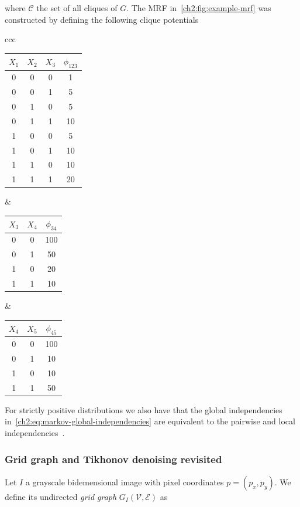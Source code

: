where $\mathcal{C}$ the set of all cliques of $G$. The MRF in~\cref{ch2:fig:example-mrf} was constructed by defining the following clique potentials

\begin{center}
\begin{tabular}{ccc}
\begin{tabular}{|c|c|c|c|}
\hline
$X_1$ & $X_2$ & $X_3$ & $\phi_{123}$\\
\hline
0 & 0 & 0 & 1\\
0 & 0 & 1 & 5\\
0 & 1 & 0 & 5\\
0 & 1 & 1 & 10\\
1 & 0 & 0 & 5\\
1 & 0 & 1 & 10\\
1 & 1 & 0 & 10\\
1 & 1 & 1 & 20\\
\hline
\end{tabular}&
\begin{tabular}{|c|c|c|}
\hline
$X_3$ & $X_4$ & $\phi_{34}$\\
\hline
0 & 0 & 100\\
0 & 1 & 50\\
1 & 0 & 20\\
1 & 1 & 10\\
\hline
\end{tabular}&
\begin{tabular}{|c|c|c|}
\hline
$X_4$ & $X_5$ & $\phi_{45}$\\
\hline
0 & 0 & 100\\
0 & 1 & 10\\
1 & 0 & 10\\
1 & 1 & 50\\
\hline
\end{tabular}
\end{tabular}
\end{center}

For strictly positive distributions we also have that the global independencies in~\cref{ch2:eq:markov-global-independencies} are equivalent to the pairwise and local independencies~\cite{koller09}.

\subsubsection{Grid graph and Tikhonov denoising revisited}
Let $I$ a grayscale bidemensional image with pixel coordinates $p=(p_x,p_y)$. We define its  undirected \emph{grid graph} $G_I(\mathcal{V},\mathcal{E})$ as

